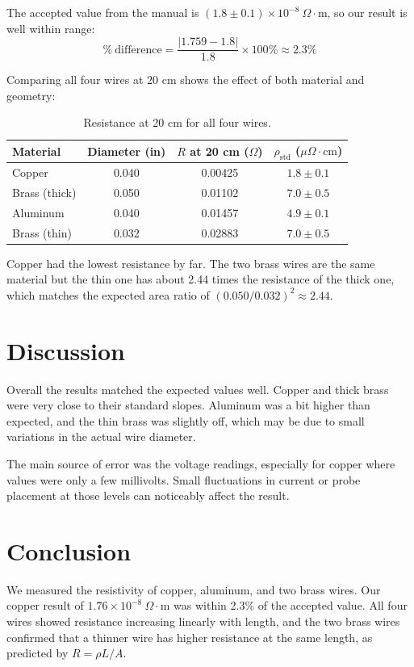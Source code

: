 \documentclass[12pt]{article}
\begin{document}
The accepted value from the manual is $(1.8 \pm 0.1) \times 10^{-8}\ \Omega \cdot \text{m}$, so our result is well within range:
\[
    \% \ \text{difference} = \frac{|1.759 - 1.8|}{1.8} \times 100\% \approx 2.3\%
\]

Comparing all four wires at 20 cm shows the effect of both material and geometry:

\begin{table}[H]
\centering
\caption{Resistance at 20 cm for all four wires.}
\begin{tabular}{lccc}
\toprule
Material & Diameter (in) & $R$ at 20 cm ($\Omega$) & $\rho_\text{std}$ ($\mu\Omega \cdot \text{cm}$) \\
\midrule
Copper        & 0.040 & 0.00425 & $1.8 \pm 0.1$ \\
Brass (thick) & 0.050 & 0.01102 & $7.0 \pm 0.5$ \\
Aluminum      & 0.040 & 0.01457 & $4.9 \pm 0.1$ \\
Brass (thin)  & 0.032 & 0.02883 & $7.0 \pm 0.5$ \\
\bottomrule
\end{tabular}
\end{table}

Copper had the lowest resistance by far. The two brass wires are the same material but the thin one has about 2.44 times the resistance of the thick one, which matches the expected area ratio of $(0.050/0.032)^2 \approx 2.44$.

\section*{Discussion}

Overall the results matched the expected values well. Copper and thick brass were very close to their standard slopes. Aluminum was a bit higher than expected, and the thin brass was slightly off, which may be due to small variations in the actual wire diameter.

The main source of error was the voltage readings, especially for copper where values were only a few millivolts. Small fluctuations in current or probe placement at those levels can noticeably affect the result.

\section*{Conclusion}

We measured the resistivity of copper, aluminum, and two brass wires. Our copper result of $1.76 \times 10^{-8}\ \Omega \cdot \text{m}$ was within 2.3\% of the accepted value. All four wires showed resistance increasing linearly with length, and the two brass wires confirmed that a thinner wire has higher resistance at the same length, as predicted by $R = \rho L/A$.
\end{document}
